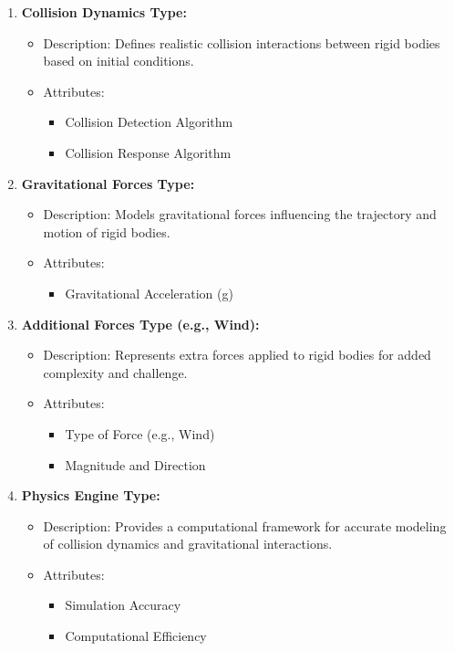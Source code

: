 \documentclass[
]{article}
\begin{document}
\begin{enumerate}
\def\labelenumi{\arabic{enumi}.}
\setcounter{enumi}{2}
\item
  \textbf{Collision Dynamics Type:}

  \begin{itemize}
  \item
    Description: Defines realistic collision interactions between rigid
    bodies based on initial conditions.
  \item
    Attributes:

    \begin{itemize}
    \item
      Collision Detection Algorithm
    \item
      Collision Response Algorithm
    \end{itemize}
  \end{itemize}
\item
  \textbf{Gravitational Forces Type:}

  \begin{itemize}
  \item
    Description: Models gravitational forces influencing the trajectory
    and motion of rigid bodies.
  \item
    Attributes:

    \begin{itemize}
    \item
      Gravitational Acceleration (g)
    \end{itemize}
  \end{itemize}
\item
  \textbf{Additional Forces Type (e.g., Wind):}

  \begin{itemize}
  \item
    Description: Represents extra forces applied to rigid bodies for
    added complexity and challenge.
  \item
    Attributes:

    \begin{itemize}
    \item
      Type of Force (e.g., Wind)
    \item
      Magnitude and Direction
    \end{itemize}
  \end{itemize}
\item
  \textbf{Physics Engine Type:}

  \begin{itemize}
  \item
    Description: Provides a computational framework for accurate
    modeling of collision dynamics and gravitational interactions.
  \item
    Attributes:

    \begin{itemize}
    \item
      Simulation Accuracy
    \item
      Computational Efficiency
    \end{itemize}
  \end{itemize}
\end{enumerate}
\end{document}
